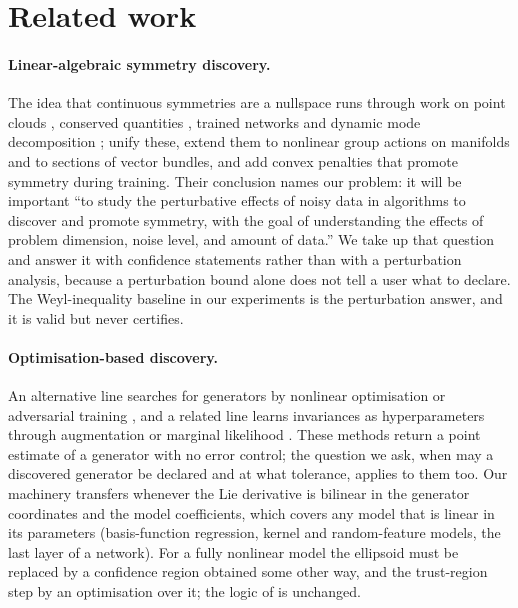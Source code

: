 \section{Related work}
\label{sec:related}

\paragraph{Linear-algebraic symmetry discovery.} The idea that continuous
symmetries are a nullspace runs through work on point clouds
\citep{cahill2023liepca}, conserved quantities \citep{kaiser2018discovering},
trained networks \citep{moskalev2022liegg,gruver2023lie} and dynamic mode
decomposition \citep{baddoo2023physics}; \citet{otto2025unified} unify these,
extend them to nonlinear group actions on manifolds and to sections of vector
bundles, and add convex penalties that promote symmetry during training. Their
conclusion names our problem: it will be important ``to study the perturbative
effects of noisy data in algorithms to discover and promote symmetry, with the
goal of understanding the effects of problem dimension, noise level, and
amount of data.'' We take up that question and answer it with confidence
statements rather than with a perturbation analysis, because a perturbation
bound alone does not tell a user what to declare. The Weyl-inequality baseline
in our experiments is the perturbation answer, and it is valid but never
certifies.

\paragraph{Optimisation-based discovery.} An alternative line searches for
generators by nonlinear optimisation or adversarial training
\citep{rao1999learning,miao2007learning,desai2022symmetry,yang2023liegan,
yang2024latent,dehmamy2021automatic,liu2022machine,forestano2023deep,
krippendorf2020detecting}, and a related line learns invariances as
hyperparameters through augmentation or marginal likelihood
\citep{benton2020learning,vanderwilk2018learning,immer2022invariance,
romero2022learning}. These methods return a point estimate of a generator with
no error control; the question we ask, when may a discovered generator be
declared and at what tolerance, applies to them too. Our machinery transfers
whenever the Lie derivative is bilinear in the generator coordinates and the
model coefficients, which covers any model that is linear in its parameters
(basis-function regression, kernel and random-feature models, the last layer
of a network). For a fully nonlinear model the ellipsoid must be replaced by a
confidence region obtained some other way, and the trust-region step by an
optimisation over it; the logic of  is unchanged.

